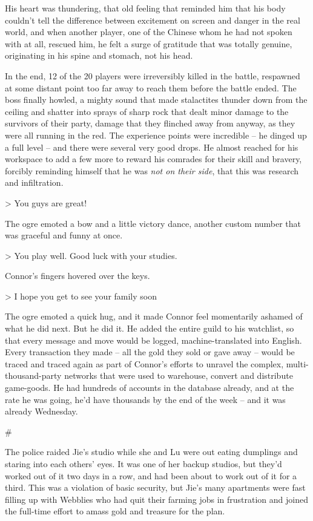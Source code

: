 His heart was thundering, that old feeling that reminded him that
his body couldn't tell the difference between excitement on screen
and danger in the real world, and when another player, one of the
Chinese whom he had not spoken with at all, rescued him, he felt a
surge of gratitude that was totally genuine, originating in his
spine and stomach, not his head.

In the end, 12 of the 20 players were irreversibly killed in the
battle, respawned at some distant point too far away to reach them
before the battle ended. The boss finally howled, a mighty sound
that made stalactites thunder down from the ceiling and shatter
into sprays of sharp rock that dealt minor damage to the survivors
of their party, damage that they flinched away from anyway, as they
were all running in the red. The experience points were incredible
-- he dinged up a full level -- and there were several very good
drops. He almost reached for his workspace to add a few more to
reward his comrades for their skill and bravery, forcibly reminding
himself that he was \emph{not on their side}, that this was
research and infiltration.

\textgreater{} You guys are great!

The ogre emoted a bow and a little victory dance, another custom
number that was graceful and funny at once.

\textgreater{} You play well. Good luck with your studies.

Connor's fingers hovered over the keys.

\textgreater{} I hope you get to see your family soon

The ogre emoted a quick hug, and it made Connor feel momentarily
ashamed of what he did next. But he did it. He added the entire
guild to his watchlist, so that every message and move would be
logged, machine-translated into English. Every transaction they
made -- all the gold they sold or gave away -- would be traced and
traced again as part of Connor's efforts to unravel the complex,
multi-thousand-party networks that were used to warehouse, convert
and distribute game-goods. He had hundreds of accounts in the
database already, and at the rate he was going, he'd have thousands
by the end of the week -- and it was already Wednesday.

\#

The police raided Jie's studio while she and Lu were out eating
dumplings and staring into each others' eyes. It was one of her
backup studios, but they'd worked out of it two days in a row, and
had been about to work out of it for a third. This was a violation
of basic security, but Jie's many apartments were fast filling up
with Webblies who had quit their farming jobs in frustration and
joined the full-time effort to amass gold and treasure for the
plan.


